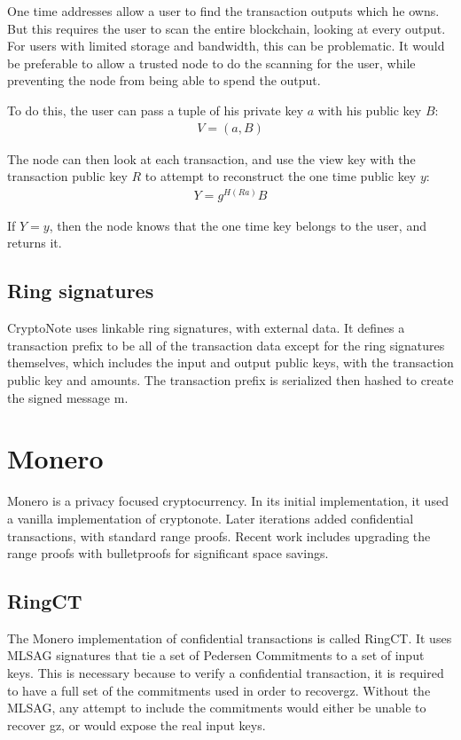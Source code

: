 \documentclass{article}
\begin{document}
One time addresses allow a user to find the transaction outputs which he owns.  But this requires the user to scan the entire blockchain, looking at every output.  For users with limited storage and bandwidth, this can be problematic.  It would be preferable to allow a trusted node to do the scanning for the user, while preventing the node from being able to spend the output.

To do this, the user can pass a tuple of his private key $a$ with his public key $B$:
\begin{eqnarray}
  V = (a, B)
\end{eqnarray}

The node can then look at each transaction, and use the view key with the transaction public key $R$ to attempt to reconstruct the one time public key $y$:
\begin{eqnarray}
  Y = g^{H(Ra)} B
\end{eqnarray}

If $Y = y$, then the node knows that the one time key belongs to the user, and returns it.


\subsection{Ring signatures}

CryptoNote uses linkable ring signatures, with external data.  It defines a transaction prefix to be all of the transaction data except for the ring signatures themselves, which includes the input and output public keys, with the transaction public key and amounts.  The transaction prefix is serialized then hashed to create the signed message m.



\section{Monero}

Monero is a privacy focused cryptocurrency.  In its initial implementation, it used a vanilla implementation of cryptonote.  Later iterations added confidential transactions, with standard range proofs.  Recent work includes upgrading the range proofs with bulletproofs for significant space savings.


\subsection{RingCT}

The Monero implementation of confidential transactions is called RingCT.  It uses MLSAG signatures that tie a set of Pedersen Commitments to a set of input keys.  This is necessary because to verify a confidential transaction, it is required to have a full set of the commitments used in order to recovergz.  Without the MLSAG, any attempt to include the commitments would either be unable to recover gz, or would expose the real input keys.
\end{document}
